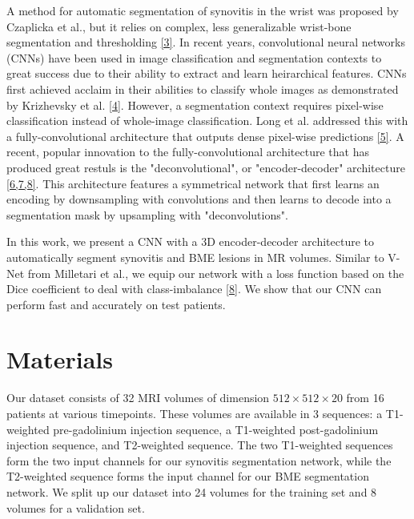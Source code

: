 \documentclass[11pt]{article}
\begin{document}
A method for automatic segmentation of synovitis in the wrist was proposed by Czaplicka et al., but it relies on complex, less generalizable wrist-bone segmentation and thresholding \hyperref[cza]{[3]}. In recent years, convolutional neural networks (CNNs) have been used in image classification and segmentation contexts to great success due to their ability to extract and learn heirarchical features. CNNs first achieved acclaim in their abilities to classify whole images as demonstrated by Krizhevsky et al. \hyperref[kriz]{[4]}. However, a segmentation context requires pixel-wise classification instead of whole-image classification. Long et al. addressed this with a fully-convolutional architecture that outputs dense pixel-wise predictions \hyperref[long]{[5]}. A recent, popular innovation to the fully-convolutional architecture that has produced great restuls is the "deconvolutional", or "encoder-decoder" architecture \hyperref[noh]{[6,7,8]}. This architecture features a symmetrical network that first learns an encoding by downsampling with convolutions and then learns to decode into a segmentation mask by upsampling with "deconvolutions". 

In this work, we present a CNN with a 3D encoder-decoder architecture to automatically segment synovitis and BME lesions in MR volumes. Similar to V-Net from Milletari et al., we equip our network with a loss function based on the Dice coefficient to deal with class-imbalance \hyperref[vnet]{[8]}. We show that our CNN can perform fast and accurately on test patients. 

\section{Materials}

Our dataset consists of 32 MRI volumes of dimension $512 \times 512 \times 20$ from 16 patients at various timepoints. These volumes are available in 3 sequences: a T1-weighted pre-gadolinium injection sequence, a T1-weighted post-gadolinium injection sequence, and T2-weighted sequence. The two T1-weighted sequences form the two input channels for our synovitis segmentation network, while the T2-weighted sequence forms the input channel for our BME segmentation network. We split up our dataset into 24 volumes for the training set and 8 volumes for a validation set. 
\end{document}
